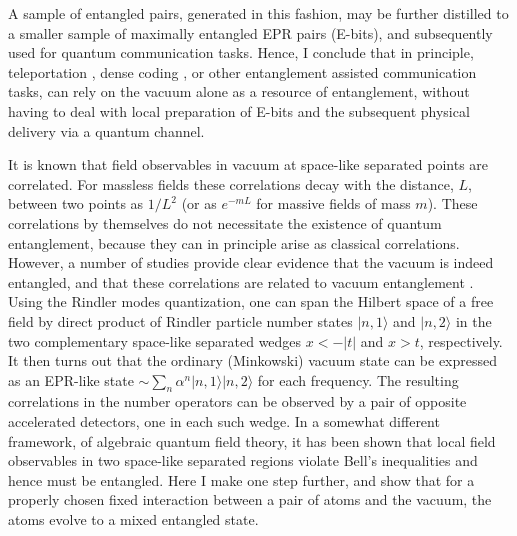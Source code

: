 \documentclass[12pt]{article}
\def \ra {\rangle}
\begin{document}
A sample of entangled pairs, generated in this fashion,
may be further distilled to a smaller sample of
maximally entangled EPR pairs (E-bits),
and subsequently used for quantum communication
tasks. Hence, I conclude that in principle, teleportation
\cite{teleportation},
dense coding \cite{densecoding},
or other entanglement  assisted communication tasks,
can rely on the vacuum alone as a resource of entanglement,
without having to deal with local preparation of E-bits and
the subsequent physical delivery via a quantum channel.


It is known that field observables in vacuum
at space-like separated points are correlated.
For  massless fields these correlations decay
with the distance,  $L$, between two points as $ 1/L^{2}$
(or as $e^{-mL}$ for massive fields of mass $m$).
These correlations by themselves do not necessitate
the existence of quantum entanglement, because
they can in principle arise as classical correlations.
However, a number of studies provide clear evidence that
the vacuum is indeed entangled\cite{unruh,werner}, and that these
correlations are related to vacuum entanglement \cite{clifton}.
Using the Rindler modes quantization,
one can span the Hilbert space of a free field by direct product
of Rindler particle number states  $|n,1\ra$ and $|n,2\ra$
in the two complementary space-like separated wedges $x<-|t|$ and $x>t$,
respectively.
It then turns out \cite{unruh}
that the ordinary (Minkowski) vacuum state
can be expressed as an EPR-like state  $\sim \sum_n \alpha^n
|n,1\ra|n,2\ra$ for each frequency.
The resulting  correlations in the number operators can be observed
by a pair of opposite accelerated detectors,
one in each such wedge.
In a somewhat different framework, of algebraic quantum
field theory, it has been shown \cite{werner}
that local field observables in two space-like
separated regions violate Bell's inequalities
and hence must be entangled.
Here I make one step further, and show that
for a properly chosen fixed interaction between a pair of atoms
and the vacuum, the atoms evolve to a mixed entangled state.
\end{document}
